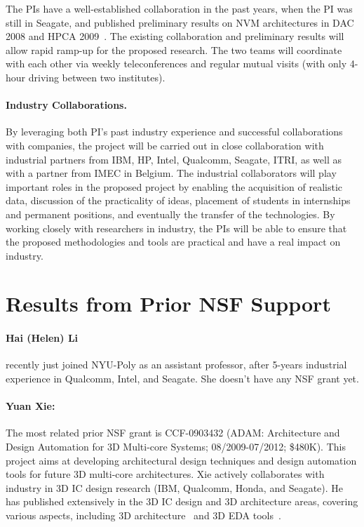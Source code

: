 The PIs have a well-established collaboration in the past years,
when the PI was still in Seagate,  and published preliminary results
on NVM architectures in DAC 2008 and HPCA 2009~\cite{XIE:HPCA09,Xie:dac08}. The existing collaboration
and preliminary results will allow rapid ramp-up for the proposed
research. The two teams will coordinate with each other via weekly
teleconferences and regular mutual visits (with only 4-hour driving between
two institutes).

\paragraph{\textbf{Industry Collaborations.}} By leveraging both PI's past industry experience and successful collaborations with companies, the project will be carried out in close collaboration with
industrial partners from IBM, HP, Intel, Qualcomm, Seagate, ITRI, as well as with
a partner from IMEC in Belgium. 
The industrial collaborators will play important roles in the
proposed project by enabling the acquisition of realistic data,
discussion of the practicality of ideas, placement of students in
internships and permanent positions, and eventually the transfer of
the technologies. By working closely with researchers in industry,
the PIs will be able to ensure that the proposed methodologies and
tools are practical and have a real impact on industry.


\section{Results
from Prior NSF Support} \label{sec:prior}

\paragraph{Hai (Helen) Li} recently just joined NYU-Poly as an assistant
professor, after 5-years industrial experience in Qualcomm, Intel,
 and Seagate. She doesn't have any NSF grant yet.

\paragraph{\textbf{Yuan Xie:}} The most related prior NSF grant is
CCF-0903432 (ADAM: Architecture and Design Automation for 3D
Multi-core Systems; 08/2009-07/2012; \$480K). This project aims at
developing architectural design techniques and design automation
tools for future 3D multi-core architectures.
Xie actively collaborates with industry in 3D IC design research
(IBM, Qualcomm, Honda, and Seagate). He has published extensively in
the 3D IC design and 3D architecture areas, covering various aspects, including 3D
architecture~\cite{Xie:MTDT09,XIE:ASPDAC09-3D,XIE:HPCA09,Xie:dac08,xie:isca08,Xie:ISCA09,xie:isca06,xie:iccd05-3d,3D:LXB07,xie:tutorial-micro06} and
3D EDA
tools~\cite{XIE:ASPDAC2009-3Dcost,xie:iccd07-3d,XIE:ICCD08-3D,xie:isqed06-3d,xie:aspdac06,XIE:TVLSI2008-3DCacti,xie:iccd05-3d,xie:jetcs06}.

